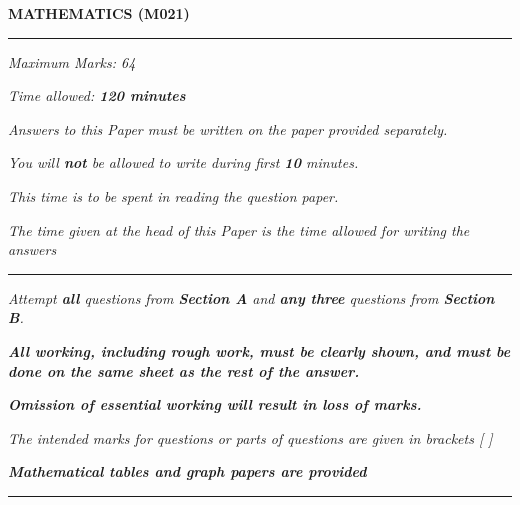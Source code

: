 \begin{center}
   \Large
   \textbf{MATHEMATICS (M021)}
   \rule{\textwidth}{0.4pt}
   \normalsize
   \textit{Maximum Marks: 64}

   \textit{Time allowed: \textbf{120 minutes}}

   \textit{Answers to this Paper must be written on the paper provided separately.}

   \textit{You will \textbf{not} be allowed to write during first \textbf{10} minutes.}

   \textit{This time is to be spent in reading the question paper.}

   \textit{The time given at the head of this Paper is the time allowed for writing the answers}
   \rule{\textwidth}{0.4pt}
   \small

   \textit{Attempt \textbf{all} questions from \textbf{Section A} and \textbf{any three} questions from \textbf{Section B}.}

   \textit{\textbf{All working, including rough work, must be clearly shown, and must be done on the same sheet as the rest of the answer.}}

   \textit{\textbf{Omission of essential working will result in loss of marks.}}

   \textit{The intended marks for questions or parts of questions are given in brackets [ ]}

   \textit{\textbf{Mathematical tables and graph papers are provided}}
   \rule{\textwidth}{0.4pt}
\end{center}
